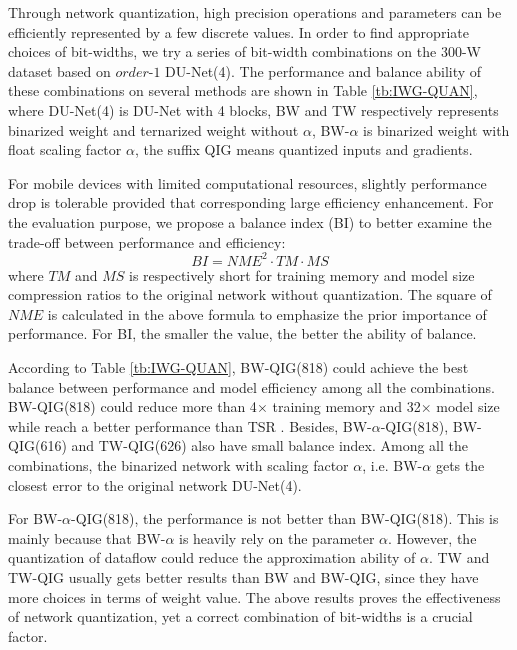 Through network quantization, high precision operations and parameters can be efficiently represented by a few discrete values. 
In order to find appropriate choices of bit-widths, we try a series of bit-width combinations on the 300-W dataset based on $order$-$1$ DU-Net(4). The performance and balance ability of these combinations on several methods are shown in Table \ref{tb:IWG-QUAN}, where DU-Net(4) is DU-Net with 4 blocks, BW and TW respectively represents binarized weight and ternarized weight without $\alpha$, BW-$\alpha$ is binarized weight with float scaling factor $\alpha$, the suffix QIG means quantized inputs and gradients. 

For mobile devices with limited computational resources, slightly performance drop is tolerable provided that corresponding large efficiency enhancement. For the evaluation purpose, we propose a balance index (BI) to better examine the trade-off between performance and efficiency: 
\begin{equation} \label{eq:bi}
BI = NME^2 \cdot TM \cdot MS  
\end{equation} 
where $TM$ and $MS$ is respectively short for training memory and model size compression ratios to the original network without quantization. The square of $NME$ is calculated in the above formula to emphasize the prior importance of performance. For BI, the smaller the value, the better the ability of balance.

According to Table \ref{tb:IWG-QUAN}, BW-QIG(818) could achieve the best balance between performance and model efficiency among all the combinations. BW-QIG(818) could reduce more than 4$\times$ training memory and 32$\times$ model size while reach a better performance than TSR \cite{lv2017deep}. Besides, BW-$\alpha$-QIG(818),  BW-QIG(616) and TW-QIG(626) also have small balance index. Among all the combinations, the binarized network with scaling factor $\alpha$, i.e. BW-$\alpha$ gets the closest error to the original network DU-Net(4).


For BW-$\alpha$-QIG(818), the performance is not better than BW-QIG(818). This is mainly because that BW-$\alpha$ is heavily rely on the parameter $\alpha$. However, the quantization of dataflow could reduce the approximation ability of $\alpha$. TW and TW-QIG usually gets better results than BW and BW-QIG, since they have more choices in terms of weight value. The above results proves the effectiveness of network quantization, yet a correct combination of bit-widths is a crucial factor.


